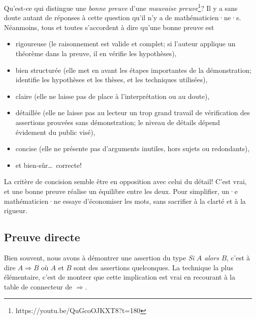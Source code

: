 \documentclass[french,course,oneside,theoremnosection]{lecture}
\newcommand{\iimplies}{\Rightarrow}
\begin{document}
Qu'est-ce qui distingue une \emph{bonne preuve} d'une \emph{mauvaise preuve}\footnote{https://youtu.be/QuGcoOJKXT8?t=180}? Il y a sans doute autant de réponses à cette question qu'il n'y a de mathématicien·ne·s. Néanmoins, tous et toutes s'accordent à dire qu'une bonne preuve est
\begin{itemize}
\item rigoureuse (le raisonnement est valide et complet; si l'auteur applique un théorème dans la preuve, il en vérifie les hypothèses),
\item bien structurée (elle met en avant les étapes importantes de la démonstration; identifie les hypothèses et les thèses, et les techniques utilisées),
\item claire (elle ne laisse pas de place à l'interprétation ou au doute),
\item détaillée (elle ne laisse pas au lecteur un trop grand travail de vérification des assertions prouvées sans démonstration; le niveau de détails dépend évidement du public visé),
\item concise (elle ne présente pas d'arguments inutiles, hors sujets ou redondants),
\item et bien-sûr\ldots~correcte!
\end{itemize}
La critère de concision semble être en opposition avec celui du détail! C'est vrai, et une bonne preuve réalise un équilibre entre les deux. Pour simplifier, un·e mathématicien·ne essaye d'économiser les mots, sans sacrifier à la clarté et à la rigueur.

\subsection{Preuve directe}

Bien souvent, nous avons à démontrer une assertion du type \emph{Si $A$ alors $B$}, c'est à dire $A \iimplies B$ où $A$ et $B$ sont des assertions quelconques. La technique la plus élémentaire, c'est de montrer que cette implication est vrai en recourant à la table de connecteur de $\iimplies$.
\end{document}
